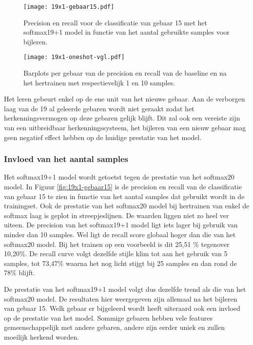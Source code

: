 \begin{figure}
	\centering
	\texttt{[image: 19x1-gebaar15.pdf]}
	\caption{Precision en recall voor de classificatie van gebaar 15 met het softmax19+1 model in functie van het aantal gebruikte samples voor bijleren.}\label{fig:19x1-gebaar15}
	
		\centering
		\texttt{[image: 19x1-oneshot-vgl.pdf]}
		\caption{Barplots per gebaar van de precision en recall van de baseline en na het hertrainen met respectievelijk 1 en 10 samples. }\label{fig:19x1-all}
\end{figure}

\npar Het leren gebeurt enkel op de ene unit van het nieuwe gebaar. Aan de verborgen laag van de 19 al geleerde gebaren wordt niet geraakt zodat het herkenningsvermogen op deze gebaren gelijk blijft. Dit zal ook een vereiste zijn van een uitbreidbaar herkenningssysteem, het bijleren van een nieuw gebaar mag geen negatief effect hebben op de huidige prestatie van het model.

\subsubsection{Invloed van het aantal samples}

Het softmax19+1 model wordt getoetst tegen de prestatie van het softmax20 model. In Figuur \ref{fig:19x1-gebaar15} is de precision en recall van de classificatie van gebaar 15 te zien in functie van het aantal samples dat gebruikt wordt in de trainingset. Ook de prestatie van het softmax20 model bij hertrainen van enkel de softmax laag is geplot in streepjeslijnen. De waarden liggen niet zo heel ver uiteen. De precision van het softmax19+1 model ligt iets lager bij gebruik van minder dan 10 samples. Wel ligt de recall score globaal hoger dan die van het softmax20 model. Bij het trainen op een voorbeeld is dit 25,51 \% tegenover 10,20\%. De recall curve volgt dezelfde stijle klim tot aan het gebruik van 5 samples, tot 73,47\% waarna het nog licht stijgt bij 25 samples en dan rond de 78\% blijft.

\npar De prestatie van het softmax19+1 model volgt dus dezelfde trend als die van het softmax20 model. De resultaten hier weergegeven zijn allemaal na het bijleren van gebaar 15. Welk gebaar er bijgeleerd wordt heeft uiteraard ook een invloed op de prestatie van het model. Sommige gebaren hebben vele features gemeenschappelijk met andere gebaren, andere zijn eerder uniek en zullen moeilijk herkend worden.

